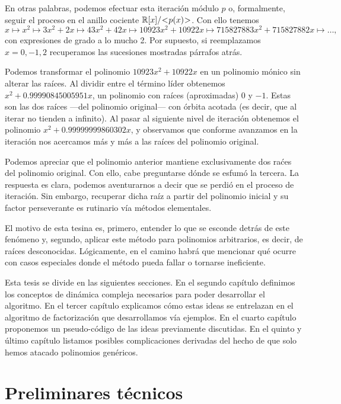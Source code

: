 \documentclass[oneside,11pt]{book}
\theoremstyle{definition}
\theoremstyle{plain}
\theoremstyle{remark}
\begin{document}
En otras palabras, podemos efectuar esta iteraci\'on m\'odulo $p$ o,
formalmente, seguir el proceso en el anillo cociente
$\mathbb{R}[x]/\negmedspace<\negmedspace p(x)\negmedspace >$.
Con ello tenemos
$$
x \mapsto x^2 \mapsto 3x^2+2x \mapsto 43x^2+42x \mapsto 10923x^2+10922x\mapsto 715827883x^2+715827882x\mapsto\dots,
$$
con expresiones de grado a lo mucho 2.
Por supuesto, si reemplazamos $x=0,-1,2$ recuperamos las sucesiones mostradas p\'arrafos atr\'as.

Podemos transformar el polinomio $10923x^2+10922x$ en un polinomio m\'onico sin alterar las ra\'ices.
Al dividir entre el t\'ermino l\'ider obtenemos  
$x^2+0.99990845005951x$, 
un polinomio con ra\'ices (aproximadas) $0$ y $-1$.
Estas son las dos ra\'ices ---del polinomio original--- con \'orbita acotada (es decir, que al iterar no tienden a infinito).
Al pasar al siguiente nivel de iteraci\'on obtenemos el polinomio 
$x^2+0.99999999860302x$, 
y observamos que conforme avanzamos en la iteraci\'on nos acercamos m\'as y m\'as a las ra\'ices del polinomio original.

Podemos apreciar que el polinomio anterior mantiene exclusivamente dos ra\'ces del polinomio original. 
Con ello, cabe preguntarse d\'onde se esfum\'o la tercera.
La respuesta es clara, podemos aventurarnos a decir que se perdi\'o en el proceso de iteraci\'on.
Sin embargo, recuperar dicha ra\'iz a partir del polinomio inicial y su factor perseverante es rutinario 
v\'ia m\'etodos elementales.

El motivo de esta tesina es, primero, 
entender lo que se esconde detr\'as de este fen\'omeno  y, 
segundo, 
aplicar este m\'etodo para polinomios arbitrarios, es decir, de ra\'ices desconocidas.
L\'ogicamente, en el camino habr\'a que mencionar 
qu\'e ocurre con casos especiales donde el m\'etodo pueda fallar o tornarse ineficiente. 

Esta tesis se divide en las siguientes secciones.
En el segundo cap\'itulo 
definimos los conceptos de din\'amica compleja necesarios para poder desarrollar el algoritmo. 
En el tercer cap\'itulo 
explicamos c\'omo estas ideas se entrelazan en el algoritmo de factorizaci\'on que desarrollamos v\'ia ejemplos.
En el cuarto cap\'itulo 
proponemos un pseudo-c\'odigo de las ideas previamente discutidas.
En el quinto y \'ultimo cap\'itulo 
listamos posibles complicaciones derivadas del hecho de que solo hemos atacado polinomios gen\'ericos. 
\bigskip

\chapter{Preliminares t\'ecnicos}
\end{document}

